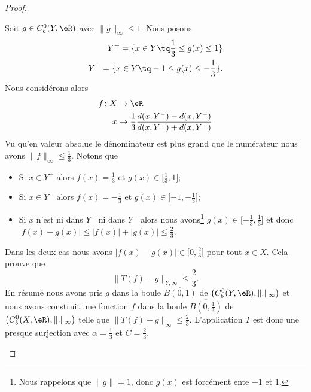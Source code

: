 \begin{proof}
\begin{subproof}
    Soit \( g\in C^0_b(Y,\eR)\) avec \( \| g \|_{\infty}\leq 1\). Nous posons
    \begin{subequations}
        \begin{align}
            Y^+=\{ x\in Y\tq \frac{1}{ 3 }\leq g(x)\leq 1 \}\\
            Y^-=\{ x\in Y\tq -1\leq g(x)\leq -\frac{1}{ 3 } \}.
        \end{align}
    \end{subequations}
    Nous considérons alors
    \begin{equation}
        \begin{aligned}
            f\colon X&\to \eR \\
            x&\mapsto \frac{1}{ 3 }\frac{ d(x,Y^-)-d(x,Y^+) }{ d(x,Y^-)+d(x,Y^+) }
        \end{aligned}
    \end{equation}
    Vu qu'en valeur absolue le dénominateur est plus grand que le numérateur nous avons \( \| f \|_{\infty}\leq \frac{1}{ 3 }\). Notons que
    \begin{itemize}
        \item Si \( x\in Y^+\) alors \( f(x)=\frac{1}{ 3 }\) et \( g(x)\in\mathopen[ \frac{1}{ 3 } , 1 \mathclose]\);
        \item Si \( x\in Y^-\) alors \( f(x)=-\frac{1}{ 3 }\) et \( g(x)\in\mathopen[-1,-\frac{1}{ 3 } \mathclose]\);
        \item Si \( x\) n'est ni dans \( Y^+\) ni dans \( Y^-\) alors nous avons\footnote{Nous rappelons que \( \| g \|=1\), donc \( g(x)\) est forcément ente \( -1\) et \( 1\).} \( g(x)\in\mathopen[ -\frac{1}{ 3 } , \frac{1}{ 3 } \mathclose]\) et donc \( \big| f(x)-g(x) \big|\leq \big| f(x) \big|+\big| g(x) \big|\leq \frac{ 2 }{ 3 }\).
    \end{itemize}
    Dans les deux cas nous avons \( \big| f(x)-g(x) \big|\in\mathopen[ 0 , \frac{ 2 }{ 3 } \mathclose]\) pour tout \( x\in X\). Cela prouve que
    \begin{equation}
        \| T(f)-g \|_{Y,\infty}\leq \frac{ 2 }{ 3 }.
    \end{equation}
    En résumé nous avons pris \( g\) dans la boule \( \overline{ B(0,1) }\) de \( \big( C^0_b(Y,\eR), \| . \|_{\infty} \big)\) et nous avons construit une fonction \( f\) dans la boule \( \overline{ B(0,\frac{1}{ 3 }) }\) de \( \big( C^0_b(X,\eR),\| . \|_{\infty} \big)\) telle que \( \| T(f)-g \|_{\infty}\leq \frac{ 2 }{ 3 }\). L'application \( T\) est donc une presque surjection avec \( \alpha=\frac{1}{ 3 }\) et \( C=\frac{ 2 }{ 3 }\).


\end{subproof}
\end{proof}
